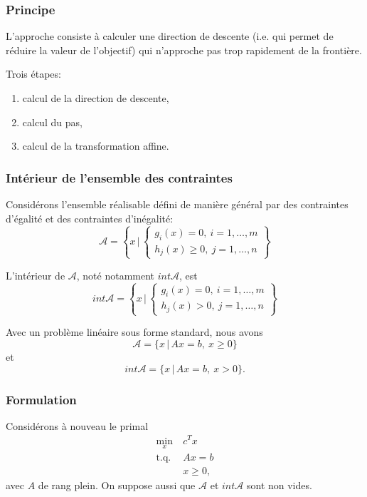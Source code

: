 \documentclass[t,usepdftitle=false]{beamer}
\def\cA{\mathcal{A}}
\begin{document}
\begin{frame}
	\frametitle{Principe}
	
	L'approche consiste à calculer une direction de descente (i.e. qui permet de réduire la valeur de l'objectif) qui n’approche pas trop rapidement
	de la frontière.
	
	\mbox{}
	
	Trois étapes:
	\begin{enumerate}
		\item 
		calcul de la direction de descente,
		\item
		calcul du pas,
		\item
		calcul de la transformation affine.
	\end{enumerate}
\end{frame}

\begin{frame}
	\frametitle{Intérieur de l'ensemble des contraintes}
	
	Considérons l'ensemble réalisable défini de manière général par des contraintes d'égalité et des contraintes d'inégalité:
	$$
	\cA = \left\{ x \,\bigg|\, \begin{cases}
		g_i(x) = 0,\ i = 1,\ldots,m \\
		h_j(x) \geq 0,\ j = 1,\ldots,n
	\end{cases}
	\right\}
	$$
	
	L'intérieur de $\cA$, noté notamment $int \cA$, est
	$$
	int \cA = \left\{ x \,\bigg|\, \begin{cases}
		g_i(x) = 0,\ i = 1,\ldots,m \\
		h_j(x) > 0,\ j = 1,\ldots,n
	\end{cases}
	\right\}
	$$
	
	Avec un problème linéaire sous forme standard, nous avons
	$$
	\cA = \{ x \,|\, Ax = b,\ x \geq 0 \}
	$$
	et
	$$
	int\cA = \{ x \,|\, Ax = b,\ x > 0 \}.
	$$
	
\end{frame}

\begin{frame}
	\frametitle{Formulation}
	
	Considérons à nouveau le primal
	\begin{align*}
		\min_x \ & c^Tx \\
		\mbox{t.q. } & Ax = b\\
		& x \geq 0,
	\end{align*}
	avec $A$ de rang plein. On suppose aussi que $\cA$ et $int\cA$ sont non vides.
	
\end{frame}
\end{document}
